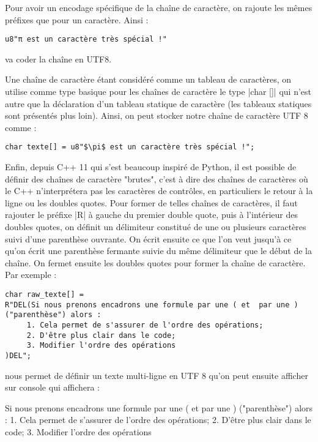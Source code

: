 Pour avoir un encodage spécifique de la chaîne de caractère, on rajoute les mêmes préfixes que pour un caractère.
Ainsi :
\begin{lstlisting}
u8"π est un caractère très spécial !"
\end{lstlisting}
va coder la chaîne en UTF8.

Une chaîne de caractère étant considéré comme un tableau de caractères, on utilise comme type basique pour les chaînes de caractère le type |char []| qui n'est autre que la déclaration d'un tableau statique de caractère (les tableaux statiques sont présentés plus loin). Ainsi, on peut stocker notre chaîne de caractère UTF 8 comme :
\begin{lstlisting}[mathescape=true]
char texte[] = u8"$\pi$ est un caractère très spécial !";
\end{lstlisting}

Enfin, depuis C++ 11 qui s'est beaucoup inspiré de Python, il est possible de définir des chaînes de caractère "brutes",
c'est à dire des chaînes de caractères où le C++ n'interprétera pas les caractères de contrôles, en particuliers le retour à la ligne ou les doubles quotes. Pour former de telles chaînes de caractères, il faut rajouter le préfixe |R| à gauche du premier double quote, puis à l'intérieur des doubles quotes, on définit un délimiteur constitué de une ou plusieurs caractères suivi d'une parenthèse ouvrante. On écrit ensuite ce que l'on veut jusqu'à ce qu'on écrit une parenthèse fermante suivie du même délimiteur que le début de la chaîne. On fermet ensuite les doubles quotes pour former la chaîne de caractère. Par exemple :
\begin{lstlisting}
char raw_texte[] = 
R"DEL(Si nous prenons encadrons une formule par une ( et  par une ) ("parenthèse") alors :
     1. Cela permet de s'assurer de l'ordre des opérations;
     2. D'être plus clair dans le code;
     3. Modifier l'ordre des opérations
)DEL";
\end{lstlisting}

nous permet de définir un texte multi-ligne en UTF 8 qu'on peut ensuite afficher sur console qui affichera :

\begin{inverseverbatim}
Si nous prenons encadrons une formule par une ( et  par une ) ("parenthèse") alors :
     1. Cela permet de s'assurer de l'ordre des opérations;
     2. D'être plus clair dans le code;
     3. Modifier l'ordre des opérations
\end{inverseverbatim}


